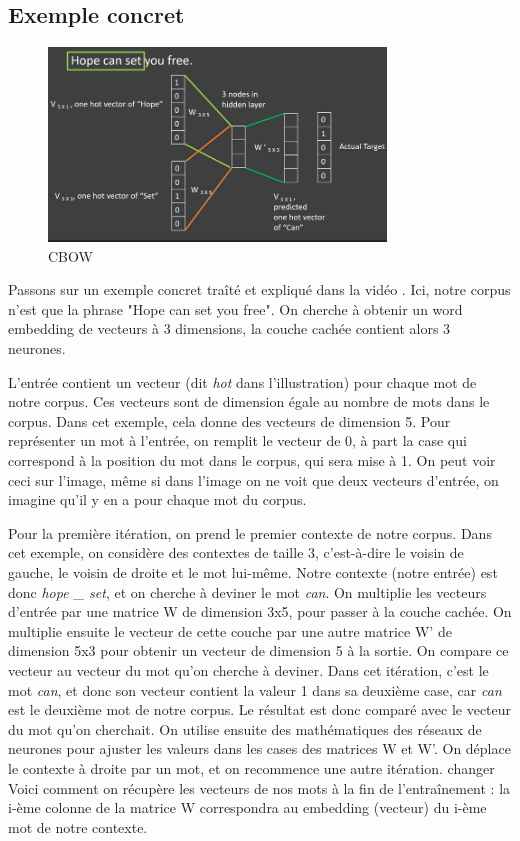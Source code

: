 \documentclass[11pt, a4paper]{report}
\begin{document}
\subsection{Exemple concret}
\begin{figure}[h]
  \centering
  \includegraphics[width=0.8\textwidth]{cbow.png}
  \caption{CBOW}
  \label{fig:cbow}
\end{figure}
Passons sur un exemple concret traîté et expliqué dans la vidéo 
\cite[\textit{Word2Vec - Skip-gram and CBOW}, The Semicolon]{word2vec-semicolon}. 
Ici, notre corpus n'est que la phrase "Hope can set you free". On cherche à obtenir un word 
embedding de vecteurs à 3 dimensions, la couche cachée contient alors 3 neurones.

L'entrée 
contient un vecteur (dit \textit{hot} dans l'illustration) pour chaque mot de notre corpus. 
Ces vecteurs sont de dimension égale au nombre de mots dans le corpus. Dans cet exemple, cela 
donne des vecteurs de dimension 5. Pour représenter un mot à l'entrée, on remplit le vecteur 
de 0, à part la case qui correspond à la position du mot dans le corpus, qui sera mise à 1. 
On peut voir ceci sur l'image, même si dans l'image on ne voit que deux vecteurs d'entrée, 
on imagine qu'il y en a pour chaque mot du corpus. 

Pour la première itération, on prend le premier contexte de notre corpus. Dans cet exemple, 
on considère des contextes de taille 3, c'est-à-dire le voisin de gauche, le voisin de droite et le mot lui-même.
Notre contexte (notre entrée) est donc \textit{hope \_ set}, et on cherche à deviner le mot \textit{can}.
On multiplie les vecteurs d'entrée par une matrice W de dimension 3x5, pour passer à la couche cachée. 
On multiplie ensuite le vecteur de cette couche par une autre matrice W' de dimension 5x3 pour obtenir 
un vecteur de dimension 5 à la sortie. On compare ce vecteur au vecteur du mot qu'on cherche à deviner. 
Dans cet itération, c'est le mot \textit{can}, et donc son vecteur contient la valeur 1 dans sa deuxième 
case, car \textit{can} est le deuxième mot de notre corpus. Le résultat est donc comparé avec le vecteur 
du mot qu'on cherchait. On utilise ensuite des mathématiques des réseaux de neurones pour ajuster les 
valeurs dans les cases des matrices W et W'. On déplace le contexte à droite par un mot, et on recommence 
une autre itération. 
changer
Voici comment on récupère les vecteurs de nos mots à la fin de l'entraînement : la i-ème colonne de la 
matrice W correspondra au embedding (vecteur) du i-ème mot de notre contexte. 
\end{document}
